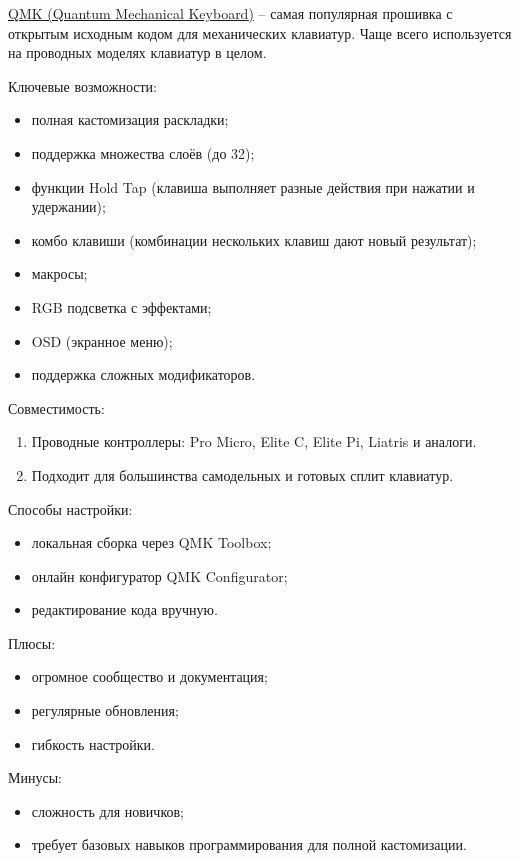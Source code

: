 \underline{QMK (Quantum Mechanical Keyboard)} -- самая популярная прошивка с открытым исходным кодом для механических клавиатур. Чаще всего используется на проводных моделях клавиатур в целом.

Ключевые возможности:

\begin{itemize}
\item полная кастомизация раскладки;
\item поддержка множества слоёв (до 32);
\item функции Hold Tap (клавиша выполняет разные действия при нажатии и удержании);
\item комбо клавиши (комбинации нескольких клавиш дают новый результат);
\item макросы;
\item RGB подсветка с эффектами;
\item OSD (экранное меню);
\item поддержка сложных модификаторов.
\end{itemize}

Совместимость:

\begin{enumerate}
\item Проводные контроллеры: Pro Micro, Elite C, Elite Pi, Liatris и аналоги.
\item Подходит для большинства самодельных и готовых сплит клавиатур.
\end{enumerate}

Способы настройки:

\begin{itemize}
\item локальная сборка через QMK Toolbox;
\item онлайн конфигуратор QMK Configurator;
\item редактирование кода вручную.
\end{itemize}

Плюсы:

\begin{itemize}
\item огромное сообщество и документация;
\item регулярные обновления;
\item гибкость настройки.
\end{itemize}

Минусы:

\begin{itemize}
\item сложность для новичков;
\item требует базовых навыков программирования для полной кастомизации.
\end{itemize}

